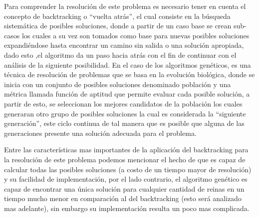 \documentclass[12pt,a4paper]{article}
\begin{document}
	Para comprender la resolución de este problema es necesario tener en cuenta el concepto de backtracking o “vuelta atrás”, el cual consiste en la búsqueda sistemática de posibles soluciones, donde a partir de un caso base se crean sub-casos  los cuales a su vez son tomados como base para nuevas posibles soluciones expandiéndose hasta encontrar un camino sin salida o una solución apropiada, dado esto ,el algoritmo da un paso hacia atrás con el fin de continuar con el análisis de la siguiente posibilidad. En el caso de los algoritmos genéticos, es una técnica de resolución de problemas que se basa en la evolución biológica, donde se inicia con un conjunto de posibles soluciones denominado población y una métrica llamada función de aptitud que permite evaluar cada posible solución, a partir de esto, se seleccionan los mejores candidatos de la población los cuales generaran otro grupo de posibles soluciones la cual es considerada la “siguiente generación”, este ciclo continua de tal manera que es posible que alguna de las generaciones presente una solución adecuada para el problema.  

	Entre las características mas importantes de la aplicación del backtracking para la resolución de este problema podemos mencionar el hecho de que es capaz de calcular todas las posibles soluciones (a costo de un tiempo mayor de resolución) y su facilidad de implementación, por el lado contrario, el algoritmo genético es capaz de encontrar una única solución  para cualquier cantidad de reinas en un tiempo mucho menor en comparación al del backtracking (esto será analizado mas adelante), sin embargo su implementación resulta un poco mas complicada.
\bigskip
\bigskip 


\pagebreak
\end{document}
